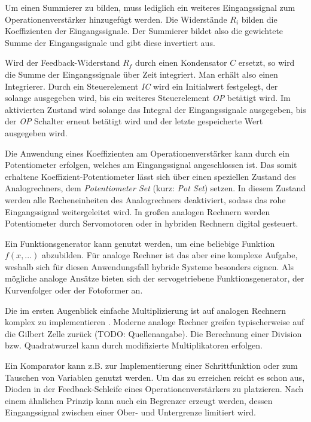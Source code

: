 Um einen Summierer zu bilden, muss lediglich ein weiteres Eingangssignal zum Operationenverstärker hinzugefügt werden. Die Widerstände \(R_i\) bilden die Koeffizienten der Eingangssignale. Der Summierer bildet also die gewichtete Summe der Eingangssignale und gibt diese invertiert aus. \cite[vgl. S. 86]{Ulmann2022}

Wird der Feedback-Widerstand \(R_f\) durch einen Kondensator \(C\) ersetzt, so wird die Summe der Eingangssignale über Zeit integriert. Man erhält also einen Integrierer. Durch ein Steuerelement \textit{IC} wird ein Initialwert festgelegt, der solange ausgegeben wird, bis ein weiteres Steuerelement \textit{OP} betätigt wird. Im aktivierten Zustand wird solange das Integral der Eingangssignale ausgegeben, bis der \textit{OP} Schalter erneut betätigt wird und der letzte gespeicherte Wert ausgegeben wird. \cite[vgl. S. 89 ff.]{Ulmann2022}

Die Anwendung eines Koeffizienten am Operationenverstärker kann durch ein Potentiometer erfolgen, welches am Eingangssignal angeschlossen ist. Das somit erhaltene Koeffizient-Potentiometer lässt sich über einen speziellen Zustand des Analogrechners, dem \textit{Potentiometer Set} (kurz: \textit{Pot Set}) setzen. In diesem Zustand werden alle Recheneinheiten des Analogrechners deaktiviert, sodass das rohe Eingangssignal weitergeleitet wird. In großen analogen Rechnern werden Potentiometer durch Servomotoren oder in hybriden Rechnern digital gesteuert. \cite[vgl. S. 92 ff.]{Ulmann2022}

Ein Funktionsgenerator kann genutzt werden, um eine beliebige Funktion \(f(x,...)\) abzubilden. Für analoge Rechner ist das aber eine komplexe Aufgabe, weshalb sich für diesen Anwendungsfall hybride Systeme besonders eignen. Als mögliche analoge Ansätze bieten sich der servogetriebene Funktionsgenerator, der Kurvenfolger oder der Fotoformer an. \cite[vgl. S. 97 ff.]{Ulmann2022}

Die im ersten Augenblick einfache Multiplizierung ist auf analogen Rechnern komplex zu implementieren \cite[vgl. S. 105]{Ulmann2022}. Moderne analoge Rechner greifen typischerweise auf die Gilbert Zelle zurück (TODO: Quellenangabe). Die Berechnung einer Division bzw. Quadratwurzel kann durch modifizierte Multiplikatoren erfolgen. \cite[S. 114 f.]{Ulmann2022}

Ein Komparator kann z.B. zur Implementierung einer Schrittfunktion oder zum Tauschen von Variablen genutzt werden. Um das zu erreichen reicht es schon aus, Dioden in der Feedback-Schleife eines Operationenverstärkers zu platzieren. Nach einem ähnlichen Prinzip kann auch ein Begrenzer erzeugt werden, dessen Eingangssignal zwischen einer Ober- und Untergrenze limitiert wird. \cite[S. 116]{Ulmann2022}
